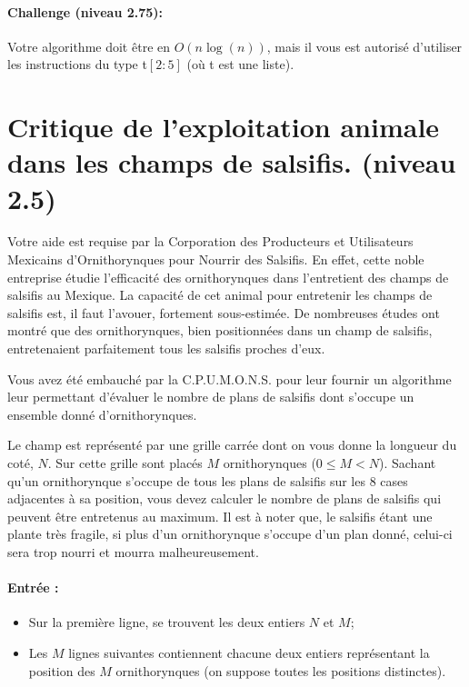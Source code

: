 \documentclass[a4paper]{article}
\begin{document}
\paragraph{Challenge (niveau 2.75): }
Votre algorithme doit être en $O(n \log (n))$, mais il vous est autorisé d'utiliser les instructions du type t$[2:5]$ (où t est une liste).


\section{Critique de l'exploitation animale dans les champs de salsifis. (niveau 2.5)}

Votre aide est requise par la Corporation des Producteurs et Utilisateurs Mexicains d'Ornithorynques pour Nourrir des Salsifis. En effet, cette noble entreprise étudie l'efficacité des ornithorynques dans l'entretient des champs de salsifis au Mexique. La capacité de cet animal pour entretenir les champs de salsifis est, il faut l'avouer, fortement sous-estimée. De nombreuses études ont montré que des ornithorynques, bien positionnées dans un champ de salsifis, entretenaient parfaitement tous les salsifis proches d'eux.

Vous avez été embauché par la C.P.U.M.O.N.S. pour leur fournir un algorithme leur permettant d'évaluer le nombre de plans de salsifis dont s'occupe un ensemble donné d'ornithorynques.

Le champ est représenté par une grille carrée dont on vous donne la longueur du coté, $N$. Sur cette grille sont placés $M$ ornithorynques ($0 \leqslant M < N$). Sachant qu'un ornithorynque s'occupe de tous les plans de salsifis sur les 8 cases adjacentes à sa position, vous devez calculer le nombre de plans de salsifis qui peuvent être entretenus au maximum. Il est à noter que, le salsifis étant une plante très fragile, si plus d'un ornithorynque s'occupe d'un plan donné, celui-ci sera trop nourri et mourra malheureusement.

\paragraph{Entrée :}
\begin{itemize}
\item Sur la première ligne, se trouvent les deux entiers $N$ et $M$;
\item Les $M$ lignes suivantes contiennent chacune deux entiers représentant la position des $M$ ornithorynques (on suppose toutes les positions distinctes).
\end{itemize}
\end{document}
